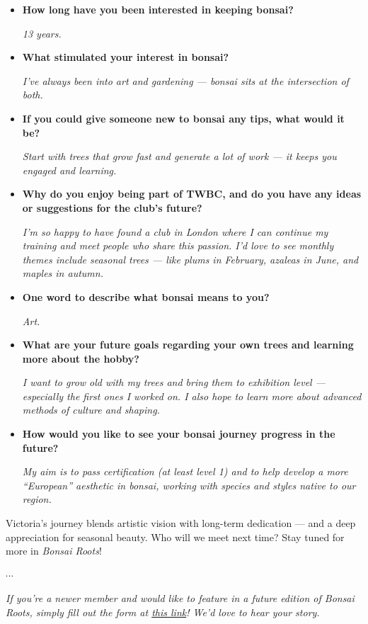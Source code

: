 \begin{itemize}
    \item \textbf{How long have you been interested in keeping bonsai?}

    \emph{13 years.}

    \item \textbf{What stimulated your interest in bonsai?}

    \emph{I've always been into art and gardening --- bonsai sits at the intersection of both.}

    \item \textbf{If you could give someone new to bonsai any tips, what would it be?}

    \emph{Start with trees that grow fast and generate a lot of work --- it keeps you engaged and learning.}

    \item \textbf{Why do you enjoy being part of TWBC, and do you have any ideas or suggestions for the club's future?}

    \emph{I'm so happy to have found a club in London where I can continue my training and meet people who share this passion. I'd love to see monthly themes include seasonal trees --- like plums in February, azaleas in June, and maples in autumn.}

    \item \textbf{One word to describe what bonsai means to you?}

    \emph{Art.}

    \item \textbf{What are your future goals regarding your own trees and learning more about the hobby?}

    \emph{I want to grow old with my trees and bring them to exhibition level --- especially the first ones I worked on. I also hope to learn more about advanced methods of culture and shaping.}

    \item \textbf{How would you like to see your bonsai journey progress in the future?}

    \emph{My aim is to pass certification (at least level 1) and to help develop a more ``European'' aesthetic in bonsai, working with species and styles native to our region.}
\end{itemize}

Victoria's journey blends artistic vision with long\--term dedication --- and a deep appreciation for seasonal beauty.
Who will we meet next time?
Stay tuned for more in \emph{Bonsai Roots}!

\begin{center}
    $\cdots$
\end{center}

\noindent
\emph{If you're a newer member and would like to feature in a future edition of Bonsai Roots, simply fill out the form at \href{https://forms.gle/quVXa4L8rhpnT5kr6}{this link}! We'd love to hear your story.}

\closearticle
\columnbreak
